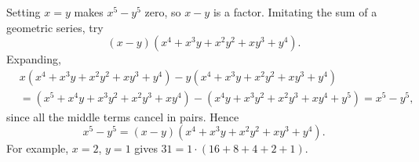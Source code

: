 Setting $x=y$ makes $x^5-y^5$ zero, so $x-y$ is a factor. Imitating the sum of a geometric series, try
\[(x-y)\left(x^4+x^3y+x^2y^2+xy^3+y^4\right).\]
Expanding,
\begin{align*}
&x\left(x^4+x^3y+x^2y^2+xy^3+y^4\right)-y\left(x^4+x^3y+x^2y^2+xy^3+y^4\right)\\
&=\left(x^5+x^4y+x^3y^2+x^2y^3+xy^4\right)-\left(x^4y+x^3y^2+x^2y^3+xy^4+y^5\right)=x^5-y^5,
\end{align*}
since all the middle terms cancel in pairs. Hence
\[\boxed{x^5-y^5=(x-y)\left(x^4+x^3y+x^2y^2+xy^3+y^4\right)}.\]
For example, $x=2$, $y=1$ gives $31=1\cdot(16+8+4+2+1)$.
